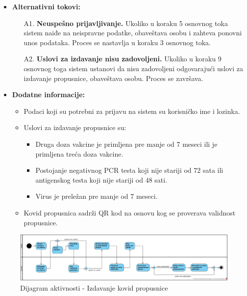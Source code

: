 \documentclass[titlepage]{article}
\begin{document}
\begin{itemize}
    
    \item \textbf{Alternativni tokovi:}
        \begin{itemize}
            \item[A1.] \textbf{Neuspešno prijavljivanje.} Ukoliko u koraku 5 osnovnog toka sistem naiđe na neispravne podatke, obaveštava osobu i zahteva ponovni unos podataka. Proces se nastavlja u koraku 3 osnovnog toka.
            \item[A2.] \textbf{Uslovi za izdavanje nisu zadovoljeni.} Ukoliko u koraku 9 osnovnog toga sistem ustanovi da nisu zadovoljeni odgovarajući uslovi za izdavanje propusnice, obaveštava osobu. Proces se završava.
        \end{itemize}
    
        
    \item \textbf{Dodatne informacije:}
        \begin{itemize}
            \item Podaci koji su potrebni za prijavu na sistem su korisničko ime i lozinka.
            \item Uslovi za izdavanje propusnice su:
                \begin{itemize}
                    \item Druga doza vakcine je primljena pre manje od 7 meseci ili  je primljena treća doza vakcine.
                    \item Postojanje negativnog PCR testa koji nije stariji od 72 sata ili antigenskog testa koji nije stariji od 48 sati.
                    \item Virus je preležan pre manje od 7 meseci.
                \end{itemize}
            \item Kovid propusnica sadrži QR kod na osnovu kog se proverava validnost propusnice.
        \end{itemize}
\end{itemize}

\begin{figure}[H]
\centering
\includegraphics[scale=0.25]{Izdavanje_propusnice}
\caption{Dijagram aktivnosti - Izdavanje kovid propusnice}
\label{slk:izdavanje}
\end{figure}
\end{document}
